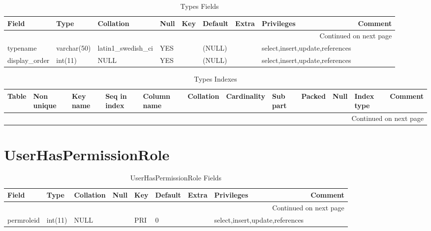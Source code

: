 \documentclass[tablesignature,landscape]{scrartcl}
\begin{document}
\begin{longtable}{|l|l|l|l|l|l|l|l|l|}
\caption{Types Fields} \label{tbl:typesfields}\\
\hline
 Field             &  Type         &  Collation                &  Null  &  Key  &  Default  &  Extra              &  Privileges                       &  Comment \\
\hline
\endhead
\hline\multicolumn{9}{r}{Continued on next page}\
\endfoot
\endlastfoot
\hline
 typeid            &  int(11)      &  NULL                     &        &  PRI  &  (NULL)   &  auto\_{}increment  &  select,insert,update,references  &           \\
 typename          &  varchar(50)  &  latin1\_{}swedish\_{}ci  &  YES   &       &  (NULL)   &                     &  select,insert,update,references  &           \\
 display\_{}order  &  int(11)      &  NULL                     &  YES   &       &  (NULL)   &                     &  select,insert,update,references  &           \\
\hline
\end{longtable}


\begin{longtable}{|l|l|l|l|l|l|l|l|l|l|l|l|}
\caption{Types Indexes} \label{tbl:typesindexes}\\
\hline
 Table  &  Non unique  &  Key name  &  Seq in index  &  Column name  &  Collation  &  Cardinality  &  Sub part  &  Packed  &  Null  &  Index type  &  Comment \\
\hline
\endhead
\hline\multicolumn{12}{r}{Continued on next page}\
\endfoot
\endlastfoot
\hline
 Types  &           0  &  PRIMARY   &             1  &  typeid       &  A          &           16  &  (NULL)    &  (NULL)  &        &  BTREE       &           \\
\hline
\end{longtable}
\section{UserHasPermissionRole}
\label{sec-34}


\begin{longtable}{|l|l|l|l|l|l|l|l|l|}
\caption{UserHasPermissionRole Fields} \label{tbl:userhaspermissionrolefields}\\
\hline
 Field       &  Type         &  Collation                &  Null  &  Key  &  Default  &  Extra  &  Privileges                       &  Comment \\
\hline
\endhead
\hline\multicolumn{9}{r}{Continued on next page}\
\endfoot
\endlastfoot
\hline
 badgeid     &  varchar(15)  &  latin1\_{}swedish\_{}ci  &        &  PRI  &           &         &  select,insert,update,references  &           \\
 permroleid  &  int(11)      &  NULL                     &        &  PRI  &        0  &         &  select,insert,update,references  &           \\
\hline
\end{longtable}
\end{document}
